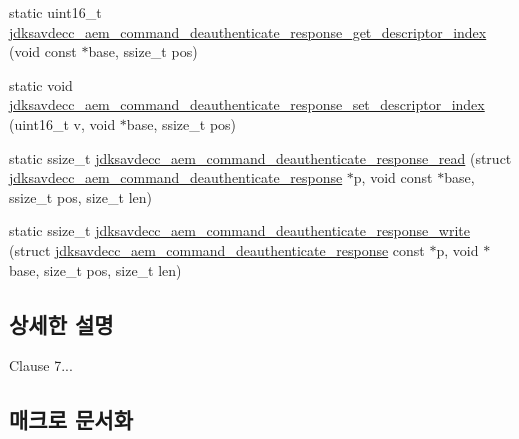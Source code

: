 \begin{DoxyCompactItemize}
\item 
static uint16\+\_\+t \hyperlink{group__command__deauthenticate__response_ga94cec0a1e1bc177734320a3f5398ff5e}{jdksavdecc\+\_\+aem\+\_\+command\+\_\+deauthenticate\+\_\+response\+\_\+get\+\_\+descriptor\+\_\+index} (void const $\ast$base, ssize\+\_\+t pos)
\item 
static void \hyperlink{group__command__deauthenticate__response_ga44c254460b22203f80bf1cfda2f29463}{jdksavdecc\+\_\+aem\+\_\+command\+\_\+deauthenticate\+\_\+response\+\_\+set\+\_\+descriptor\+\_\+index} (uint16\+\_\+t v, void $\ast$base, ssize\+\_\+t pos)
\item 
static ssize\+\_\+t \hyperlink{group__command__deauthenticate__response_gab1be8a7a4a51573fa9b9e41b795a169c}{jdksavdecc\+\_\+aem\+\_\+command\+\_\+deauthenticate\+\_\+response\+\_\+read} (struct \hyperlink{structjdksavdecc__aem__command__deauthenticate__response}{jdksavdecc\+\_\+aem\+\_\+command\+\_\+deauthenticate\+\_\+response} $\ast$p, void const $\ast$base, ssize\+\_\+t pos, size\+\_\+t len)
\item 
static ssize\+\_\+t \hyperlink{group__command__deauthenticate__response_ga18ae0144932791596f14576ba1b1844c}{jdksavdecc\+\_\+aem\+\_\+command\+\_\+deauthenticate\+\_\+response\+\_\+write} (struct \hyperlink{structjdksavdecc__aem__command__deauthenticate__response}{jdksavdecc\+\_\+aem\+\_\+command\+\_\+deauthenticate\+\_\+response} const $\ast$p, void $\ast$base, size\+\_\+t pos, size\+\_\+t len)
\end{DoxyCompactItemize}


\subsection{상세한 설명}
Clause 7... 

\subsection{매크로 문서화}
